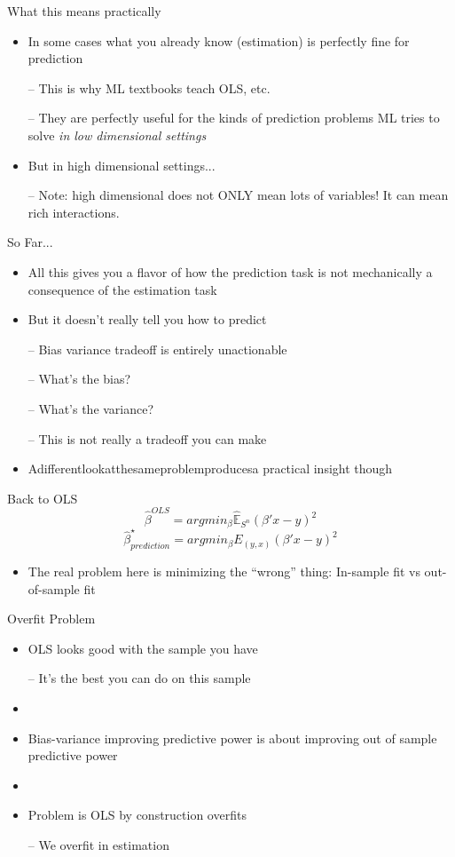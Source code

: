 \documentclass{beamer}
\begin{document}
\begin{frame}{What this means practically}
	\begin{itemize}
		\item In some cases what you already know (estimation) is perfectly fine for prediction
		
		– This is why ML textbooks teach OLS, etc.
		
		– They are perfectly useful for the kinds of prediction problems ML tries to solve \textit{in low dimensional settings}
		\item But in high dimensional settings...
		
		– Note: high dimensional does not ONLY mean lots of variables! It can mean rich interactions.
	\end{itemize}
\end{frame}

\begin{frame}{So Far...}
	\begin{itemize}
		\item All this gives you a flavor of how the prediction task is not mechanically a consequence of the estimation task
		\item But it doesn’t really tell you how to predict 
		
		– Bias variance tradeoff is entirely unactionable 
		
		– What’s the bias?
		
		– What’s the variance?
		
		– This is not really a tradeoff you can make
		\item Adifferentlookatthesameproblemproducesa practical insight though
	\end{itemize}
\end{frame}

\begin{frame}{Back to OLS}
		$$\hat{\beta}^{OLS}=argmin_{\beta}\hat{\mathbb{E}}_{S^n}(\beta'x-y)^2$$
		$$\hat{\beta}_{prediction}^{\star}=argmin_{\beta}E_{(y,x)}(\beta'x-y)^2$$
	\begin{itemize}
		\item The real problem here is minimizing the “wrong” thing: In-sample fit vs out-of-sample fit
	\end{itemize}
\end{frame}

\begin{frame}{Overfit Problem}
	\begin{itemize}
		\item OLS looks good with the sample you have
		
		– It’s the best you can do on this sample
		\item[]
		\item Bias-variance improving predictive power is about improving out of sample predictive power
		\item[]
		\item Problem is OLS by construction overfits 
		
		– We overfit in estimation
	\end{itemize}
\end{frame}
\end{document}
